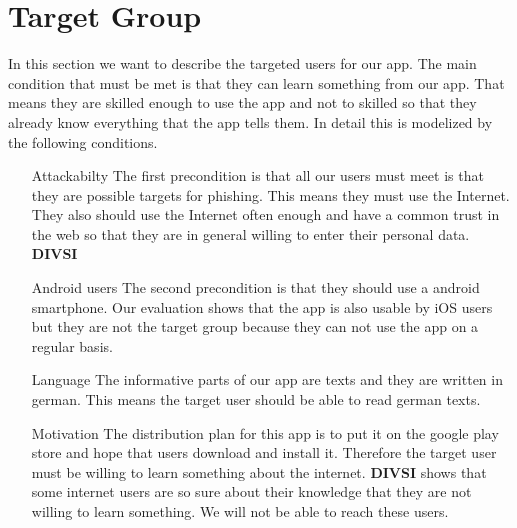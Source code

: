\section{Target Group}
\label{s:target_group}
In this section we want to describe the targeted users for our app.
The main condition that must be met is that they can learn something from our app.
That means they are skilled enough to use the app and not to skilled so that they already know everything that the app tells them.
In detail this is modelized by the following conditions.
\begin{itemize}
\item[Attackabilty]
The first precondition is that all our users must meet is that they are possible targets for phishing.
This means they must use the Internet.
They also should use the Internet often enough and have a common trust in the web so that they are in general willing to enter their personal data.
\textbf{DIVSI}
\item[Android users]
The second precondition is that they should use a android smartphone.
Our evaluation shows that the app is also usable by iOS users but they are not the target group because they can not use the app on a regular basis.
\item[Language]
The informative parts of our app are texts and they are written in german.
This means the target user should be able to read german texts.
\item[Motivation]
The distribution plan for this app is to put it on the google play store and hope that users download and install it.
Therefore the target user must be willing to learn something about the internet.
\textbf{DIVSI} shows that some internet users are so sure about their knowledge that they are not willing to learn something.
We will not be able to reach these users.
\end{itemize}

